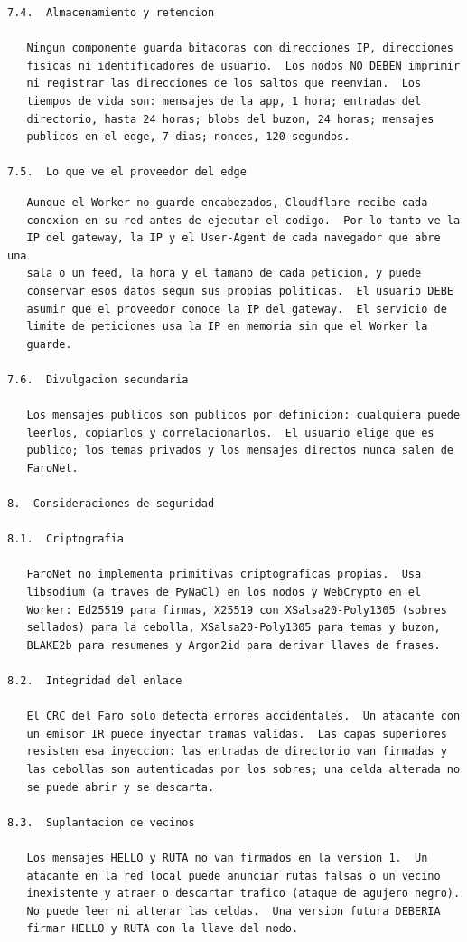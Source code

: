 \begin{Verbatim}
7.4.  Almacenamiento y retencion

   Ningun componente guarda bitacoras con direcciones IP, direcciones
   fisicas ni identificadores de usuario.  Los nodos NO DEBEN imprimir
   ni registrar las direcciones de los saltos que reenvian.  Los
   tiempos de vida son: mensajes de la app, 1 hora; entradas del
   directorio, hasta 24 horas; blobs del buzon, 24 horas; mensajes
   publicos en el edge, 7 dias; nonces, 120 segundos.

7.5.  Lo que ve el proveedor del edge
\end{Verbatim}
\newpage
\begin{Verbatim}
   Aunque el Worker no guarde encabezados, Cloudflare recibe cada
   conexion en su red antes de ejecutar el codigo.  Por lo tanto ve la
   IP del gateway, la IP y el User-Agent de cada navegador que abre una
   sala o un feed, la hora y el tamano de cada peticion, y puede
   conservar esos datos segun sus propias politicas.  El usuario DEBE
   asumir que el proveedor conoce la IP del gateway.  El servicio de
   limite de peticiones usa la IP en memoria sin que el Worker la
   guarde.

7.6.  Divulgacion secundaria

   Los mensajes publicos son publicos por definicion: cualquiera puede
   leerlos, copiarlos y correlacionarlos.  El usuario elige que es
   publico; los temas privados y los mensajes directos nunca salen de
   FaroNet.

8.  Consideraciones de seguridad

8.1.  Criptografia

   FaroNet no implementa primitivas criptograficas propias.  Usa
   libsodium (a traves de PyNaCl) en los nodos y WebCrypto en el
   Worker: Ed25519 para firmas, X25519 con XSalsa20-Poly1305 (sobres
   sellados) para la cebolla, XSalsa20-Poly1305 para temas y buzon,
   BLAKE2b para resumenes y Argon2id para derivar llaves de frases.

8.2.  Integridad del enlace

   El CRC del Faro solo detecta errores accidentales.  Un atacante con
   un emisor IR puede inyectar tramas validas.  Las capas superiores
   resisten esa inyeccion: las entradas de directorio van firmadas y
   las cebollas son autenticadas por los sobres; una celda alterada no
   se puede abrir y se descarta.

8.3.  Suplantacion de vecinos

   Los mensajes HELLO y RUTA no van firmados en la version 1.  Un
   atacante en la red local puede anunciar rutas falsas o un vecino
   inexistente y atraer o descartar trafico (ataque de agujero negro).
   No puede leer ni alterar las celdas.  Una version futura DEBERIA
   firmar HELLO y RUTA con la llave del nodo.


\end{Verbatim}
